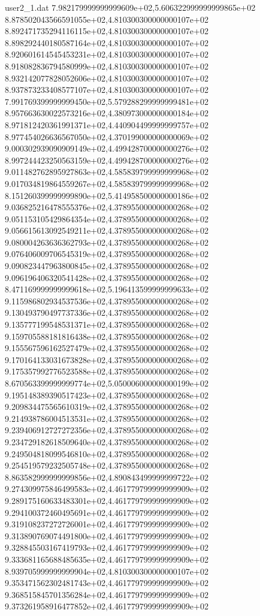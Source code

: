 \begin{filecontents}{user2_1.dat}
7.982179999999999609e+02,5.606322999999999865e+02
8.878502043566591055e+02,4.810300300000000107e+02
8.892471735294116115e+02,4.810300300000000107e+02
8.898292440180587164e+02,4.810300300000000107e+02
8.920601614545453231e+02,4.810300300000000107e+02
8.918082836794580999e+02,4.810300300000000107e+02
8.932142077828052606e+02,4.810300300000000107e+02
8.937873233408577107e+02,4.810300300000000107e+02
7.991769399999999450e+02,5.579288299999999481e+02
8.957663630022573216e+02,4.380973000000000184e+02
8.971812420361991371e+02,4.440904499999999757e+02
8.977454026636567050e+02,4.370199000000000069e+02
9.000302939090909149e+02,4.499428700000000276e+02
8.997244423250563159e+02,4.499428700000000276e+02
9.011482762895927863e+02,4.585839799999999968e+02
9.017034819864559267e+02,4.585839799999999968e+02
8.151260399999999890e+02,5.414958500000000186e+02
9.036825216478555376e+02,4.378955000000000268e+02
9.051153105429864354e+02,4.378955000000000268e+02
9.056615613092549211e+02,4.378955000000000268e+02
9.080004263636362793e+02,4.378955000000000268e+02
9.076406009706545319e+02,4.378955000000000268e+02
9.090823447963800845e+02,4.378955000000000268e+02
9.096196406320541428e+02,4.378955000000000268e+02
8.471169999999999618e+02,5.196413599999999633e+02
9.115986802934537536e+02,4.378955000000000268e+02
9.130493790497737336e+02,4.378955000000000268e+02
9.135777199548531371e+02,4.378955000000000268e+02
9.159705588181816438e+02,4.378955000000000268e+02
9.155567596162527479e+02,4.378955000000000268e+02
9.170164133031673828e+02,4.378955000000000268e+02
9.175357992776523588e+02,4.378955000000000268e+02
8.670563399999999774e+02,5.050006000000000199e+02
9.195148389390517423e+02,4.378955000000000268e+02
9.209834475565610319e+02,4.378955000000000268e+02
9.214938786004513531e+02,4.378955000000000268e+02
9.239406912727272356e+02,4.378955000000000268e+02
9.234729182618509640e+02,4.378955000000000268e+02
9.249504818099546810e+02,4.378955000000000268e+02
9.254519579232505748e+02,4.378955000000000268e+02
8.863582999999999856e+02,4.890843499999999722e+02
9.274309975846499583e+02,4.461779799999999909e+02
9.289175160633483301e+02,4.461779799999999909e+02
9.294100372460495691e+02,4.461779799999999909e+02
9.319108237272726001e+02,4.461779799999999909e+02
9.313890769074491800e+02,4.461779799999999909e+02
9.328845503167419793e+02,4.461779799999999909e+02
9.333681165688485635e+02,4.461779799999999909e+02
8.939705999999999904e+02,4.810300300000000107e+02
9.353471562302481743e+02,4.461779799999999909e+02
9.368515845701356284e+02,4.461779799999999909e+02
9.373261958916477852e+02,4.461779799999999909e+02

\end{filecontents}
